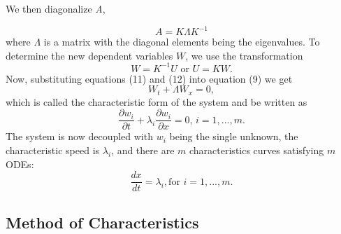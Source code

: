 \documentclass[]{article}
\begin{document}
	We then diagonalize \textit{A},
	
	\begin{equation}
		A = K \Lambda K^{-1}
	\end{equation}
	where $\Lambda$ is a matrix with the diagonal elements being the eigenvalues. To determine the new dependent variables $ W $, we use the transformation
	\begin{equation}
		W = K^{-1} U  \mbox{ or }  U = KW.
	\end{equation}
	Now, substituting equations (11) and (12) into equation (9) we get
	\begin{equation}
		W_t + \Lambda W_x = 0,
	\end{equation}
	which is called the characteristic form of the system and be written as 
	\begin{equation}
		\frac{\partial w_i}{\partial t} + \lambda_i \frac{\partial w_i}{\partial x} = 0 \mbox{,    } i = 1,...,m.
	\end{equation}
	The system is now decoupled with $w_i$ being the single unknown, the characteristic speed is $\lambda_i$, and there are $ m $ characteristics curves satisfying $m$ ODEs:
	\begin{equation}
		\frac{dx}{dt} = \lambda_i, \mbox{for } i = 1,...,m.
	\end{equation}
	
	\subsection{Method of Characteristics}
	
\end{document}
